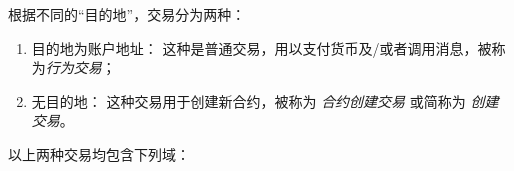 根据不同的“目的地”，交易分为两种：
\begin{enumerate}[nosep]
	\item {目的地为账户地址：} 这种是普通交易，用以支付货币及/或者调用消息，被称为\emph{行为交易}；

	\item {无目的地：} 这种交易用于创建新合约，被称为 \emph{合约创建交易} 或简称为 \emph{创建交易}。
\end{enumerate}
以上两种交易均包含下列域：
